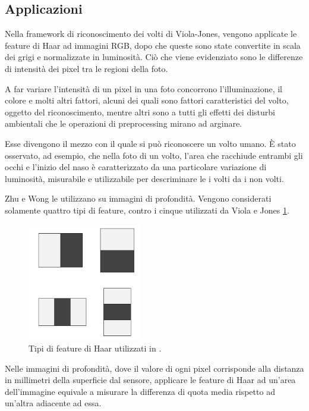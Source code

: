         \subsection{Applicazioni} %
        \label{sub:haar_features_applications}
            Nella framework di riconoscimento dei volti di Viola-Jones, vengono applicate le feature di Haar ad immagini RGB, dopo che queste sono state convertite in scala dei grigi e normalizzate in luminosità.
            Ciò che viene evidenziato sono le differenze di intensità dei pixel tra le regioni della foto.

            A far variare l'intensità di un pixel in una foto concorrono l'illuminazione, il colore e molti altri fattori, alcuni dei quali sono fattori caratteristici del volto, oggetto del riconoscimento, mentre altri sono a tutti gli effetti dei disturbi ambientali che le operazioni di preprocessing mirano ad arginare.

            Esse divengono il mezzo con il quale si può riconoscere un volto umano.
            È stato osservato, ad esempio, che nella foto di un volto, l'area che racchiude entrambi gli occhi e l'inizio del naso è caratterizzato da una particolare variazione di luminosità, misurabile e utilizzabile per descriminare le i volti da i non volti.

            Zhu e Wong le utilizzano su immagini di profondità.
            Vengono considerati solamente quattro tipi di feature, contro i cinque utilizzati da Viola e Jones \ref{fig:features_type}.
            \begin{figure}
                \centering
                \includegraphics[width=5cm]{img/feature_types.jpg}
                \caption{Tipi di feature di Haar utilizzati in \cite{Zhu13}.}
                \label{fig:features_type}
            \end{figure}

            Nelle immagini di profondità, dove il valore di ogni pixel corrisponde alla distanza in millimetri della superficie dal sensore, applicare le feature di Haar ad un'area dell'immagine equivale a misurare la differenza di quota media rispetto ad un'altra adiacente ad essa.

